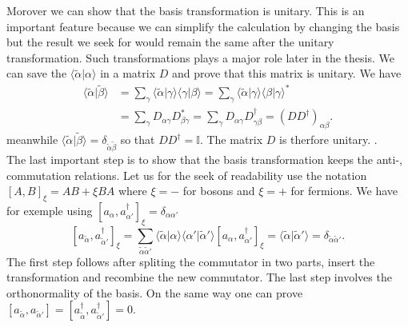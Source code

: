 \documentclass[../main.tex]{subfile}
\begin{document}
Morover we can show that the basis transformation is unitary. This is an important feature because we can simplify the calculation by changing the basis but
the result we seek for would remain the same after the unitary transformation. Such transformations plays a major role later in the thesis.
We can save the $\langle \tilde{\alpha} | \alpha\rangle$ in a matrix $D$ and prove that this matrix is unitary. We have
\begin{align*}
    \langle \tilde{\alpha} | \tilde{\beta}\rangle  &= \sum_{\gamma} \langle \tilde{\alpha}|\gamma\rangle\langle \gamma | \beta\rangle =  \sum_{\gamma} \langle \tilde{\alpha}|\gamma\rangle \langle \beta | \gamma\rangle^{\ast}\\
    &=\sum_{\gamma} D_{\alpha\gamma}D_{\beta\gamma}^{\ast} = \sum_{\gamma} D_{\alpha\gamma}D^{\dagger}_{\gamma\beta} = (DD^{\dagger})_{\alpha\beta}.
\end{align*} 
meanwhile $\langle \tilde{\alpha} | \tilde{\beta}\rangle = \delta_{\tilde{\alpha} \tilde{\beta}}$ so that $DD^{\dagger} = \mathbb{I}$. The matrix $D$ is therfore unitary. .\\

The last important step is to show that the basis transformation keeps the anti-, commutation relations. Let us for the seek of readability
use the notation $[A,B]_{\xi} = AB + \xi BA$ where $\xi = -$ for bosons and $\xi = +$ for fermions. We have for exemple using $[a_{\alpha}, a_{\alpha'}^{\dagger}]_{\xi} = \delta_{\alpha\alpha'}$
\[
    [a_{\tilde{\alpha}}, a_{\tilde{\alpha}'}^{\dagger}]_{\xi} = \sum_{\tilde{\alpha}\tilde{\alpha}'} \langle \tilde{\alpha}|\alpha\rangle\langle\alpha'|\tilde{\alpha}'\rangle [a_{\alpha}, a_{\alpha'}^{\dagger}]_{\xi} = \langle \tilde{\alpha}|\tilde{\alpha}'\rangle = \delta_{\tilde{\alpha}\tilde{\alpha}'}.
\]
The first step follows after spliting the commutator in two parts, insert the transformation and recombine the new commutator. 
The last step involves the orthonormality of the basis.
On the same way one can prove $[a_{\tilde{\alpha}},a_{\tilde{\alpha}'}] = [a_{\tilde{\alpha}}^{\dagger},a_{\tilde{\alpha}'}^{\dagger}] = 0$.
  
\end{document}

